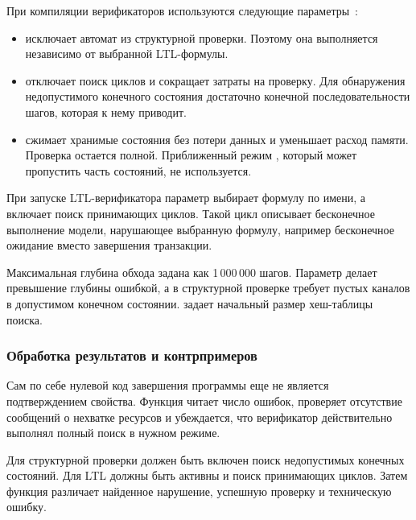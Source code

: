 При компиляции верификаторов используются следующие параметры~\cite{pan}:
\begin{itemize}
    \item {} исключает автомат 
    из структурной проверки. Поэтому она выполняется независимо
    от выбранной LTL-формулы.
    \item {} отключает поиск циклов и сокращает затраты
    на проверку. Для обнаружения недопустимого конечного состояния
    достаточно конечной последовательности шагов, которая к нему приводит.
    \item {} сжимает хранимые состояния без потери данных
    и уменьшает расход памяти. Проверка остается полной.
    Приближенный режим , который может пропустить
    часть состояний, не используется.
\end{itemize}

При запуске LTL-верификатора параметр  выбирает формулу по имени,
а  включает поиск принимающих циклов. Такой цикл
описывает бесконечное выполнение модели, нарушающее выбранную формулу,
например бесконечное ожидание вместо завершения транзакции.

Максимальная глубина обхода задана как 1\,000\,000 шагов. Параметр
 делает превышение глубины ошибкой, а  в структурной
проверке требует пустых каналов в допустимом конечном состоянии.
 задает начальный размер хеш-таблицы поиска.

\subsubsection{Обработка результатов и контрпримеров}

Сам по себе нулевой код завершения программы еще не является
подтверждением свойства. Функция  читает число
ошибок, проверяет отсутствие сообщений о нехватке ресурсов и убеждается,
что верификатор действительно выполнял полный поиск в нужном режиме.


Для структурной проверки должен быть включен поиск недопустимых конечных
состояний. Для LTL должны быть активны  и поиск
принимающих циклов. Затем функция  различает найденное
нарушение, успешную проверку и техническую ошибку.


